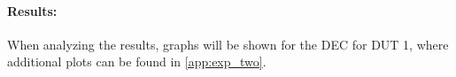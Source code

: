 

\paragraph{Results:} When analyzing the results, graphs will be shown for the DEC for DUT 1, where additional plots can be found in \cref{app:exp_two}.









